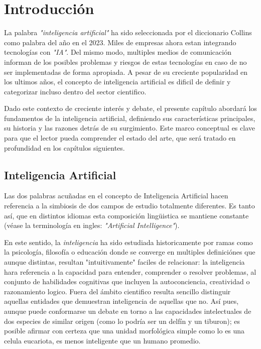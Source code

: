 \chapter{Introducción}

La palabra \emph{"inteligencia artificial"} ha sido seleccionada por el
diccionario Collins como palabra del año en el 2023. Miles de empresas ahora
estan integrando tecnologías con \emph{"IA"}. Del mismo modo, multiples medios
de comunicación informan de los posibles problemas y riesgos de estas
tecnologías en caso de no ser implementadas de forma apropiada. A pesar de su
creciente popularidad en los ultimos años, el concepto de inteligencia
artificial es dificil de definir y categorizar incluso dentro del sector
cientifico.

Dado este contexto de creciente interés y debate, el presente capítulo
abordará los fundamentos de la inteligencia artificial, definiendo
sus características principales, su historia y las razones detrás de su
surgimiento.  Este marco conceptual es clave para que el lector pueda comprender
el estado del arte, que será tratado en profundidad en los capítulos siguientes.

\section{Inteligencia Artificial}
Las dos palabras acuñadas en el concepto de Inteligencia Artificial hacen
referencia a la simbiosis de dos campos de estudio totalmente diferentes. Es
tanto así, que en distintos idiomas esta composición lingüistica se mantiene
constante (véase la terminología en ingles: \emph{"Artificial Intelligence"}).

En este sentido, la \emph{inteligencia} ha sido estudiada historicamente por
ramas como la psicología, filosofía o educación donde se converge en multiples
definiciónes que aunque distintas, resultan "intuitivamente" faciles de
relacionar: la inteligencia hara referencia a la capacidad para entender,
comprender o resolver problemas, al conjunto de habilidades cognitivas que
incluyen la autoconciencia, creatividad o razonamiento logico. Fuera del ámbito
cientifico resulta sencillo distinguir aquellas entidades que demuestran
inteligencia de aquellas que no. Así pues, aunque puede conformarse un debate en
torno a las capacidades intelectuales de dos especies de similar origen (como lo
podría ser un delfín y un tiburon); es posible afirmar con certeza que una
unidad morfológica simple como lo es una celula eucariota, es menos inteligente
que un humano promedio.

